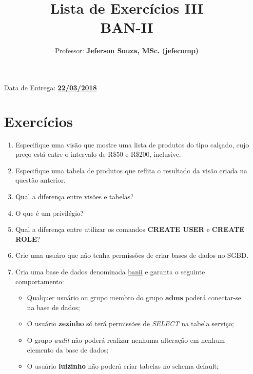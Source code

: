 \documentclass[12pt]{article}
\title{Lista de Exercícios III\\
BAN-II}
\author{Professor: \textbf{Jeferson Souza, MSc. (jefecomp)}}
\begin{document}
\date{}

\maketitle

\begin{center}
Data de Entrega: \textbf{\underline{22/03/2018}}
\end{center}

\section*{Exercícios}

\begin{enumerate}
\itemsep 10mm

\item Especifique uma visão que mostre uma lista de produtos do tipo calçado, cujo preço está entre o intervalo de R\$50 e R\$200, inclusive.

\item Especifique uma tabela de produtos que reflita o resultado da visão criada na questão anterior.

\item Qual a diferença entre visões e tabelas?

\item O que é um privilégio?

\item Qual a diferença entre utilizar os comandos \textbf{CREATE USER} e \textbf{CREATE ROLE}?

\item Crie uma usuáro que não tenha permissões de criar bases de dados no SGBD.

\item Cria uma base de dados denominada \underline{banii} e garanta o seguinte comportamento:

\begin{itemize}
\item Qualquer usuário ou grupo membro do grupo \textbf{adms} poderá conectar-se na base de dados;

\item O usuário \textbf{zezinho} só terá permissões de \textit{SELECT} na tabela serviço;

\item O grupo \textit{audit} não poderá realizar nenhuma alteração em nenhum elemento da base de dados;

\item O usuário \textbf{luizinho} não poderá criar tabelas no schema default;

\end{itemize}

\end{enumerate}
\end{document}
